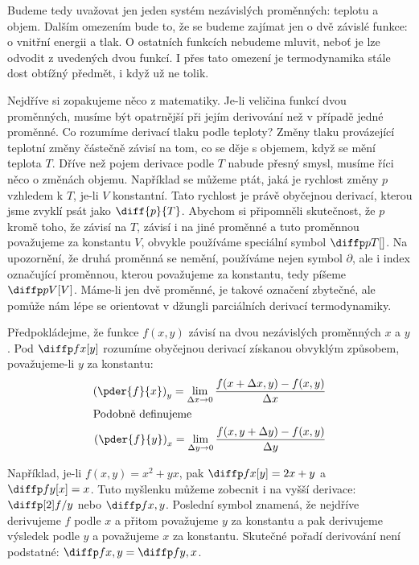     Budeme tedy uvažovat jen jeden systém nezávislých proměnných: teplotu a objem. Dalším
    omezením bude to, že se budeme zajímat jen o dvě závislé funkce: o vnitřní energii a tlak. O
    ostatních funkcích nebudeme mluvit, neboť je lze odvodit z uvedených dvou funkcí. I přes tato
    omezení je termodynamika stále dost obtížný předmět, i když už ne tolik.

    Nejdříve si zopakujeme něco z matematiky. Je-li veličina funkcí dvou proměnných, musíme být
    opatrnější při jejím derivování než v případě jedné proměnné. Co rozumíme derivací tlaku podle
    teploty? Změny tlaku provázející teplotní změny částečně závisí na tom, co se děje s objemem,
    když se mění teplota \(T\). Dříve než pojem derivace podle \(T\) nabude přesný smysl, musíme
    říci něco o změnách objemu. Například se můžeme ptát, jaká je rychlost změny \(p\) vzhledem k
    \(T\), je-li \(V\) konstantní. Tato rychlost je právě obyčejnou derivací, kterou jsme zvyklí
    psát jako \(\diff{p}{T}\). Abychom si připomněli skutečnost, že \(p\) kromě toho, že závisí na
    \(T\), závisí i na jiné proměnné a tuto proměnnou považujeme za konstantu \(V\), obvykle
    používáme speciální symbol \(\diffp pT[]\). Na upozornění, že druhá proměnná se nemění,
    používáme nejen symbol \(\partial\), ale i index označující proměnnou, kterou považujeme za
    konstantu, tedy píšeme \(\diffp pV[V]\). Máme-li jen dvě proměnné, je takové
    označení zbytečné, ale pomůže nám lépe se orientovat v džungli parciálních derivací
    termodynamiky.

    Předpokládejme, že funkce \(f(x, y)\) závisí na dvou nezávislých proměnných \(x\) a \(y\). Pod
    \(\diffp fx[y]\) rozumíme obyčejnou derivací získanou obvyklým způsobem, považujeme-li \(y\) za
    konstantu:
    \begin{align*}
      \left(\pder{f}{x}\right)_y = \lim_{\Delta x \rightarrow0} 
                                   \dfrac{f(x+\Delta x,y) - f(x,y)}{\Delta x}   \\
      \shortintertext{Podobně definujeme}
      \left(\pder{f}{y}\right)_x = \lim_{\Delta y \rightarrow0} 
                                   \dfrac{f(x,y +\Delta y) - f(x,y)}{\Delta y}  
    \end{align*}

    Například, je-li \(f(x, y) =x^2 + yx\), pak \(\diffp fx[y] = 2x + y\) a \(\diffp fy[x] = x\).
    Tuto myšlenku můžeme zobecnit i na vyšší derivace: \(\diffp[2]f/y\) nebo \(\diffp f{x,y}\).
    Poslední symbol znamená, že nejdříve derivujeme \(f\) podle \(x\) a přitom považujeme \(y\) za
    konstantu a pak derivujeme výsledek podle \(y\) a považujeme \(x\) za konstantu. Skutečné pořadí
    derivování není podstatné: \(\diffp f{x,y} = \diffp f{y,x}\).

